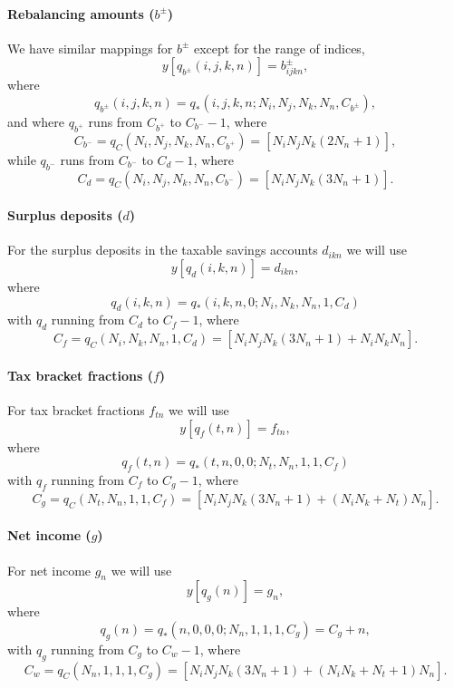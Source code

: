 \documentclass{article}[fleqn,12pt]
\begin{document}
\paragraph*{Rebalancing amounts (\boldmath$b^\pm$)}
We have similar mappings for $b^\pm$ except for the range of indices,
\begin{equation}
	y[q_{b^\pm}(i, j, k, n)] = b^\pm_{ijkn},
\end{equation}
where
\begin{equation}
	q_{b^\pm}(i, j, k, n) = q_*(i, j, k, n; N_i, N_j, N_k, N_n, C_{b^\pm}),
\end{equation}
and where
$q_{b^+}$ runs from $C_{b^+}$ to $C_{b^-} - 1$,
where
\[
	C_{b^-} = q_C(N_i, N_j, N_k, N_n, C_{b^+}) = [N_i N_j N_k (2N_n + 1)],
\]
while
$q_{b^-}$ runs from $C_{b^-}$ to $C_d - 1$, where
\[
	C_d = q_C(N_i, N_j, N_k, N_n, C_{b^-}) = [N_i N_j N_k  (3N_n + 1)].
\]

\paragraph*{Surplus deposits (\boldmath$d$)}
For the surplus deposits in the taxable savings accounts $d_{ikn}$ we will use
\begin{equation}
	y[q_d(i, k, n)] = d_{ikn},
\end{equation}
where
\begin{equation}
	q_d(i, k, n) = q_*(i, k, n, 0; N_i, N_k, N_n, 1, C_d)
\end{equation}
with $q_d$ running from $C_d$ to $C_f - 1$, where
\[
	C_f = q_C(N_i, N_k, N_n, 1, C_d) = [N_iN_jN_k(3N_n+1) + N_iN_kN_n].
\]

\paragraph*{Tax bracket fractions (\boldmath$f$)}
For tax bracket fractions $f_{t n}$ we will use
\begin{equation}
	y[q_f(t, n)] = f_{t n},
\end{equation}
where
\begin{equation}
	q_f(t, n) = q_*(t, n, 0, 0; N_t, N_n, 1, 1, C_f)
\end{equation}
with $q_f$ running from $C_f$ to $C_g - 1$, where
\[
	C_g = q_C(N_t, N_n, 1, 1, C_f) = [N_iN_jN_k(3N_n+1) + (N_iN_k + N_t) N_n].
\]

\paragraph*{Net income (\boldmath$g$)}
For net income $g_{n}$ we will use
\begin{equation}
	y[q_g(n)] = g_{n},
\end{equation}
where
\begin{equation}
	q_g(n) = q_*(n, 0, 0, 0; N_n, 1, 1, 1, C_g) = C_g + n,
\end{equation}
with $q_g$ running from $C_g$ to $C_w - 1$, where
\[
	C_w = q_C(N_n, 1, 1, 1, C_g) = [N_iN_jN_k(3N_n+1) + (N_iN_k + N_t + 1) N_n].
\]
\end{document}
